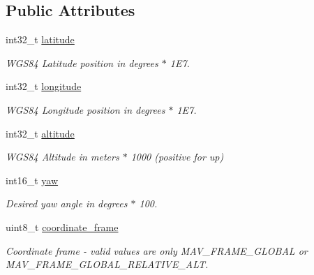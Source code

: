 \subsection*{Public Attributes}
\begin{DoxyCompactItemize}
\item 
int32\+\_\+t \hyperlink{struct____mavlink__global__position__setpoint__int__t_a7b02635b701aa77624372077915df167}{latitude}
\begin{DoxyCompactList}\small\item\em W\+G\+S84 Latitude position in degrees $\ast$ 1\+E7. \end{DoxyCompactList}\item 
int32\+\_\+t \hyperlink{struct____mavlink__global__position__setpoint__int__t_a290bd746e9d22250d7a9396afbc8a8b9}{longitude}
\begin{DoxyCompactList}\small\item\em W\+G\+S84 Longitude position in degrees $\ast$ 1\+E7. \end{DoxyCompactList}\item 
int32\+\_\+t \hyperlink{struct____mavlink__global__position__setpoint__int__t_a73aa1270e7a36b8b86857221366b5a4d}{altitude}
\begin{DoxyCompactList}\small\item\em W\+G\+S84 Altitude in meters $\ast$ 1000 (positive for up) \end{DoxyCompactList}\item 
\hypertarget{struct____mavlink__global__position__setpoint__int__t_ab4e559ebe301ccdb64580e34febf2d86}{int16\+\_\+t \hyperlink{struct____mavlink__global__position__setpoint__int__t_ab4e559ebe301ccdb64580e34febf2d86}{yaw}}\label{struct____mavlink__global__position__setpoint__int__t_ab4e559ebe301ccdb64580e34febf2d86}

\begin{DoxyCompactList}\small\item\em Desired yaw angle in degrees $\ast$ 100. \end{DoxyCompactList}\item 
\hypertarget{struct____mavlink__global__position__setpoint__int__t_aca893671888c2856ff4e8d67a267d3ac}{uint8\+\_\+t \hyperlink{struct____mavlink__global__position__setpoint__int__t_aca893671888c2856ff4e8d67a267d3ac}{coordinate\+\_\+frame}}\label{struct____mavlink__global__position__setpoint__int__t_aca893671888c2856ff4e8d67a267d3ac}

\begin{DoxyCompactList}\small\item\em Coordinate frame -\/ valid values are only M\+A\+V\+\_\+\+F\+R\+A\+M\+E\+\_\+\+G\+L\+O\+B\+A\+L or M\+A\+V\+\_\+\+F\+R\+A\+M\+E\+\_\+\+G\+L\+O\+B\+A\+L\+\_\+\+R\+E\+L\+A\+T\+I\+V\+E\+\_\+\+A\+L\+T. \end{DoxyCompactList}\end{DoxyCompactItemize}


